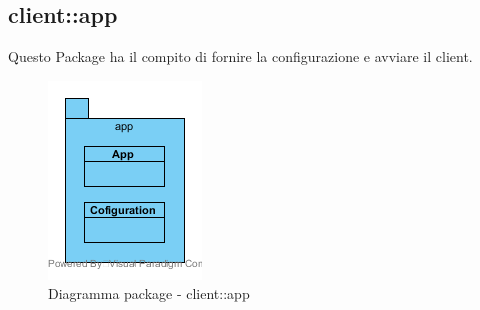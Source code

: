 \subsection{client::app}
Questo Package ha il compito di fornire la configurazione e avviare il client.\begin{center}
	\begin{figure}[H]
		\centering \includegraphics[scale=4, max width=\textwidth, max height=\myheight]{../img/diagrammiClassi/client/app.png}
		\caption{Diagramma package - client::app}
	\end{figure}
\end{center}\hypertarget{client::app::App}{}
